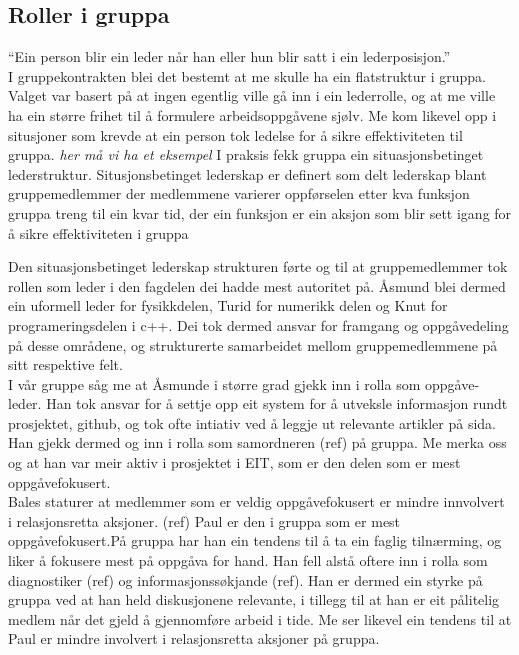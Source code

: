 \subsection{Roller i gruppa}
``Ein person blir ein leder når han eller hun blir satt i ein lederposisjon.'' \\


I gruppekontrakten blei det bestemt at me skulle ha ein flatstruktur i gruppa. Valget var basert på at ingen egentlig ville gå inn i ein lederrolle, og at me ville ha ein større frihet til å formulere arbeidsoppgåvene sjølv. Me kom likevel opp i situsjoner som krevde at ein person tok ledelse for å sikre effektiviteten til gruppa. \emph{her må vi ha et eksempel} I praksis fekk gruppa ein situasjonsbetinget lederstruktur. Situsjonsbetinget lederskap er definert som delt lederskap blant gruppemedlemmer der medlemmene varierer oppførselen etter kva funksjon gruppa treng til ein kvar tid, der ein funksjon er ein aksjon som blir sett igang for å sikre effektiviteten i gruppa%

Den situasjonsbetinget lederskap strukturen førte og til at gruppemedlemmer tok rollen som leder i den fagdelen dei hadde mest autoritet på. Åsmund blei dermed ein uformell leder for fysikkdelen, Turid for numerikk delen og Knut for programeringsdelen i c++. Dei tok dermed ansvar for framgang og oppgåvedeling på desse områdene, og strukturerte samarbeidet mellom gruppemedlemmene på sitt respektive felt. \\

I vår gruppe såg me at Åsmunde i større grad gjekk inn i rolla som oppgåve-leder. Han tok ansvar for å settje opp eit system for å utveksle informasjon rundt prosjektet, github, og tok ofte intiativ ved å leggje ut relevante artikler på sida. Han gjekk dermed og inn i rolla som  samordneren (ref) på gruppa. Me merka oss og at han var meir aktiv i prosjektet i EIT, som er den delen som er mest oppgåvefokusert. \\

Bales staturer at medlemmer som er veldig oppgåvefokusert er mindre innvolvert i relasjonsretta aksjoner. (ref) Paul er den i gruppa som er mest oppgåvefokusert.På gruppa har han ein tendens til å ta ein faglig tilnærming, og liker å fokusere mest på oppgåva for hand. Han fell alstå oftere inn i rolla som diagnostiker (ref) og informasjonssøkjande (ref). Han er dermed ein styrke på gruppa ved at han held diskusjonene relevante, i tillegg til at han er eit pålitelig medlem når det gjeld å gjennomføre arbeid i tide. Me ser likevel ein tendens til at Paul er mindre involvert i relasjonsretta aksjoner på gruppa. \\

